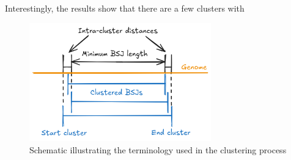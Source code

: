 Interestingly, the results show that there are a few clusters with 



\begin{figure}[ht] \centering

    \includegraphics[width=0.7\textwidth]{chapters/4_results_and_discussion/figures/grouping.png}
    \caption{Schematic illustrating the terminology used in the clustering
        process}
    \label{fig:clustering_expl} \end{figure}

